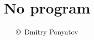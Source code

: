 
\title{No program}
\author{\copyright\ Dmitry Ponyatov }

\maketitle
\tableofcontents\secdown





